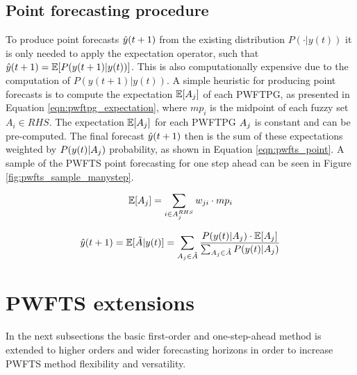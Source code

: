 \subsection{Point forecasting procedure}
\label{sec:pwfts_point}

To produce point forecasts $\hat{y}(t+1)$ from the existing distribution $P(\cdot|y(t))$ it is only needed to apply the expectation operator, such that $\hat{y}(t+1) = \mathbb{E}[P(y(t+1)|y(t))]$. This is also computationally expensive due to the computation of $P(y(t+1)|y(t))$. A simple heuristic for producing point forecasts is to compute the expectation $\mathbb{E}[A_j]$ of each PWFTPG, as presented in Equation \ref{eqn:pwftpg_expectation}, where $mp_i$ is the midpoint of each fuzzy set $A_i \in RHS$. The expectation $\mathbb{E}[A_j]$ for each PWFTPG $A_j$ is constant and can be pre-computed. The final forecast $\hat{y}(t+1)$ then is the sum of these expectations weighted by $P( y(t) | A_j)$ probability, as shown in Equation \ref{eqn:pwfts_point}. A sample of the PWFTS point forecasting for one step ahead can be seen in Figure \ref{fig:pwfts_sample_manystep}.

\begin{equation}
\mathbb{E}[ A_j ] = \displaystyle \sum_{i \in A_j^{RHS}} w_{ji}\cdot mp_i
\label{eqn:pwftpg_expectation}
\end{equation}

\begin{equation}
\hat{y}(t+1) = \displaystyle \mathbb{E}[ \tilde{A} | y(t) ] =  \sum_{A_j \in \tilde{A}} \frac{ P(y(t) | A_j) \cdot \mathbb{E}[ A_j ]} { \sum_{A_j \in \tilde{A}} P(y(t) | A_j)}
\label{eqn:pwfts_point}
\end{equation}


\section{PWFTS extensions}
\label{sec:pwfts_extensions}

In the next subsections the basic first-order and one-step-ahead method is extended to higher orders and wider forecasting horizons in order to increase PWFTS method flexibility and versatility.

